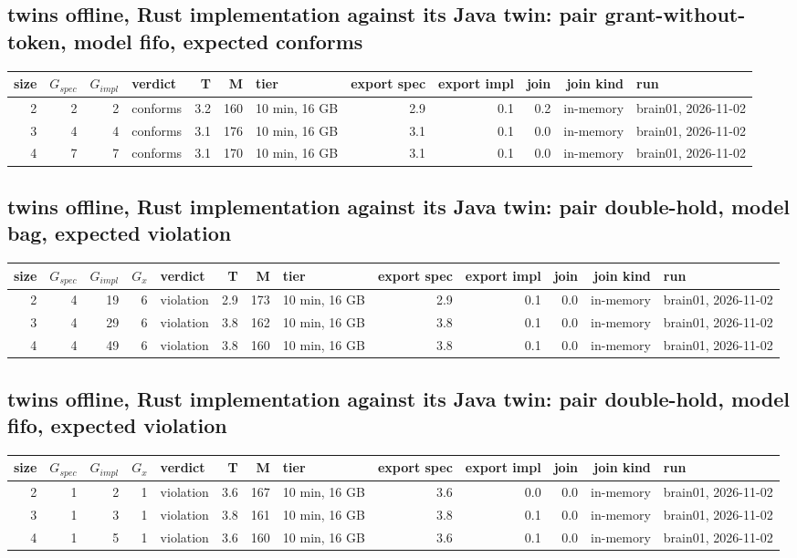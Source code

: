 \documentclass[10pt]{article}
\begin{document}
\subsection*{twins offline, Rust implementation against its Java twin: pair \textsf{grant-without-token}, model fifo, expected conforms}
\begin{longtable}{@{}rrrlrrlrrrrl@{}}
\toprule
size & $G_{\mathit{spec}}$ & $G_{\mathit{impl}}$ & verdict & T & M & tier & export spec & export impl & join & join kind & run \\
\midrule
\endhead
\color{red} 2 & 2 & 2 & conforms & 3.2 & 160 & 10 min, 16 GB & 2.9 & 0.1 & 0.2 & in-memory & brain01, 2026-11-02 \\
\color{red} 3 & 4 & 4 & conforms & 3.1 & 176 & 10 min, 16 GB & 3.1 & 0.1 & 0.0 & in-memory & brain01, 2026-11-02 \\
\color{red} 4 & 7 & 7 & conforms & 3.1 & 170 & 10 min, 16 GB & 3.1 & 0.1 & 0.0 & in-memory & brain01, 2026-11-02 \\
\bottomrule
\end{longtable}
\subsection*{twins offline, Rust implementation against its Java twin: pair \textsf{double-hold}, model bag, expected violation}
\begin{longtable}{@{}rrrrlrrlrrrrl@{}}
\toprule
size & $G_{\mathit{spec}}$ & $G_{\mathit{impl}}$ & $G_x$ & verdict & T & M & tier & export spec & export impl & join & join kind & run \\
\midrule
\endhead
\color{red} 2 & 4 & 19 & 6 & violation & 2.9 & 173 & 10 min, 16 GB & 2.9 & 0.1 & 0.0 & in-memory & brain01, 2026-11-02 \\
\color{red} 3 & 4 & 29 & 6 & violation & 3.8 & 162 & 10 min, 16 GB & 3.8 & 0.1 & 0.0 & in-memory & brain01, 2026-11-02 \\
\color{red} 4 & 4 & 49 & 6 & violation & 3.8 & 160 & 10 min, 16 GB & 3.8 & 0.1 & 0.0 & in-memory & brain01, 2026-11-02 \\
\bottomrule
\end{longtable}
\subsection*{twins offline, Rust implementation against its Java twin: pair \textsf{double-hold}, model fifo, expected violation}
\begin{longtable}{@{}rrrrlrrlrrrrl@{}}
\toprule
size & $G_{\mathit{spec}}$ & $G_{\mathit{impl}}$ & $G_x$ & verdict & T & M & tier & export spec & export impl & join & join kind & run \\
\midrule
\endhead
\color{red} 2 & 1 & 2 & 1 & violation & 3.6 & 167 & 10 min, 16 GB & 3.6 & 0.0 & 0.0 & in-memory & brain01, 2026-11-02 \\
\color{red} 3 & 1 & 3 & 1 & violation & 3.8 & 161 & 10 min, 16 GB & 3.8 & 0.1 & 0.0 & in-memory & brain01, 2026-11-02 \\
\color{red} 4 & 1 & 5 & 1 & violation & 3.6 & 160 & 10 min, 16 GB & 3.6 & 0.1 & 0.0 & in-memory & brain01, 2026-11-02 \\
\bottomrule
\end{longtable}
\end{document}
